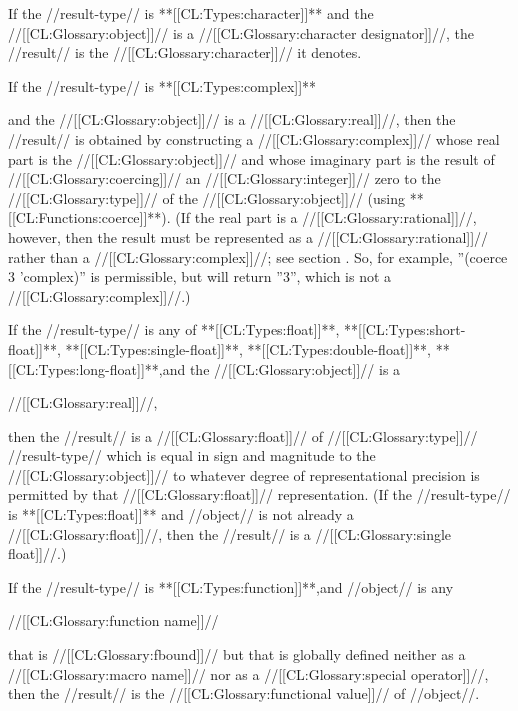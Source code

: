 
If the //result-type// is **[[CL:Types:character]]** and the //[[CL:Glossary:object]]// is a //[[CL:Glossary:character designator]]//, the //result// is the //[[CL:Glossary:character]]// it denotes.


If the //result-type// is **[[CL:Types:complex]]**

and the //[[CL:Glossary:object]]// is a //[[CL:Glossary:real]]//, then the //result// is obtained by constructing a //[[CL:Glossary:complex]]// whose real part is the //[[CL:Glossary:object]]// and whose imaginary part is the result of //[[CL:Glossary:coercing]]// an //[[CL:Glossary:integer]]// zero to the //[[CL:Glossary:type]]// of the //[[CL:Glossary:object]]// (using **[[CL:Functions:coerce]]**). (If the real part is a //[[CL:Glossary:rational]]//, however, then the result must be represented as a //[[CL:Glossary:rational]]// rather than a //[[CL:Glossary:complex]]//; see section {\secref\RuleOfCanonRepForComplexRationals}. So, for example, ''(coerce 3 'complex)'' is permissible, but will return ''3'', which is not a //[[CL:Glossary:complex]]//.)


If the //result-type// is any of **[[CL:Types:float]]**, **[[CL:Types:short-float]]**, **[[CL:Types:single-float]]**, **[[CL:Types:double-float]]**, **[[CL:Types:long-float]]**,and the //[[CL:Glossary:object]]// is a

//[[CL:Glossary:real]]//,

then the //result// is a //[[CL:Glossary:float]]// of //[[CL:Glossary:type]]// //result-type// which is equal in sign and magnitude to the //[[CL:Glossary:object]]// to whatever degree of representational precision is permitted by that //[[CL:Glossary:float]]// representation. (If the //result-type// is **[[CL:Types:float]]** and //object// is not already a //[[CL:Glossary:float]]//, then the //result// is a //[[CL:Glossary:single float]]//.)


If the //result-type// is **[[CL:Types:function]]**,and //object// is any

//[[CL:Glossary:function name]]//

that is //[[CL:Glossary:fbound]]// but that is globally defined neither as a //[[CL:Glossary:macro name]]// nor as a //[[CL:Glossary:special operator]]//, then the //result// is the //[[CL:Glossary:functional value]]// of //object//.

